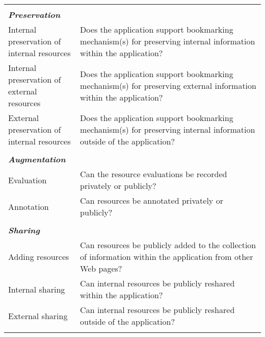 {\begin{table*}[htbp]
\begin{tabular}{|p{0.28\linewidth}|p{0.72\linewidth}|}
&\\
\emph{\textbf{Preservation}}                   &                                                                                                           \\
Internal preservation of internal resources       & Does the application support bookmarking mechanism(s) for preserving internal information within the application?        \\
Internal preservation of external resources       & Does the application support bookmarking mechanism(s) for preserving external information within the application?        \\
External preservation of internal resources      & Does the application support bookmarking mechanism(s) for preserving internal information outside of the application? \\ 
&\\
\emph{\textbf{Augmentation}}            &                                                                                                           \\
Evaluation                   & Can the resource evaluations be recorded privately or publicly? \\
Annotation                   & Can resources be annotated privately or publicly?                                                                               \\    
&\\        
\emph{\textbf{Sharing}}            &                                                                                                           \\
Adding resources             & Can resources be publicly added to the collection of information within the application from other Web pages?     \\
Internal sharing         & Can internal resources be publicly reshared within the application?         \\ 
External sharing          & Can internal resources be publicly reshared outside of the application?         \\ 
&\\           
\hline
\end{tabular}
\end{table*}



} %

